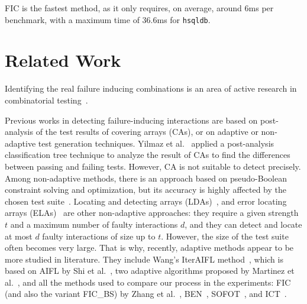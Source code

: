 \begin{tikzborder}{\cite{Gargantini16:validation}}
\begin{tikzborder}{\cite{gargantini_combinatorial_2017}}
\begin{tikzborder}{\cite{gargantini_combinatorial_2017}}
\begin{tikzborder}{\cite{garn2019}}
\begin{tikzborder}{\cite{arcaini2019achieving}}
\begin{tikzborder}{}
FIC is the fastest method, as it only requires, on average, around 6ms per benchmark, with a maximum time of 36.6ms for \texttt{hsqldb}.

\end{tikzborder}
\section{Related Work}\label{sec:related}
\begin{tikzborder}{}	

Identifying the real failure inducing combinations is an area of active research in combinatorial testing~\cite{nie_2011, kuhn_practical_2010}.

Previous works in detecting failure-inducing interactions are based on post-analysis of the test results of covering arrays (CAs), or on adaptive or non-adaptive test generation techniques. Yilmaz et al.~\cite{CohenTSE06} applied a post-analysis classification tree technique to analyze the result of CAs to find the differences between passing and failing tests. However, CA is not suitable to detect \mfics precisely. Among non-adaptive methods, there is an approach based on pseudo-Boolean constraint solving and optimization, but its accuracy is highly affected by the chosen test suite~\cite{Zhang2012FII}.
Locating and detecting arrays (LDAs)~\cite{colbourn_locating_2008}, 
and error locating arrays (ELAs)~\cite{martinez_locating_2010} are other non-adaptive approaches: they require a given strength $t$ and a maximum number of faulty interactions $d$, and they can detect and locate at most $d$ faulty interactions of size up to $t$. However, the size of the test suite often becomes very large. That is why, recently, adaptive methods appear to be more studied in literature. They include Wang's IterAIFL method~\cite{wang_adaptive_2010}, which is based on AIFL by Shi et al.~\cite{shi_software_nodate}, two adaptive algorithms proposed by Martinez et al.~\cite{martinez_locating_2010}, and all the methods used to compare our process in the experiments: FIC (and also the variant FIC\_BS) by Zhang et al.~\cite{zhang_characterizing_2011}, BEN~\cite{ghandehari2018combinatorial}, SOFOT~\cite{nie_2011}, and ICT~\cite{Niu2018interleaving}.


\end{tikzborder}
\end{tikzborder}
\end{tikzborder}
\end{tikzborder}
\end{tikzborder}
\end{tikzborder}
